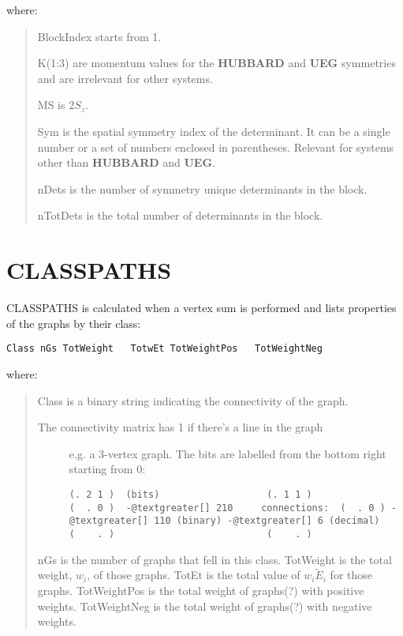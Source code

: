 \documentclass[openany,a4paper,10pt,english]{manual}
\begin{document}
where:
\begin{quote}

BlockIndex starts from 1.

K(1:3) are momentum values for the \textbf{HUBBARD} and \textbf{UEG} symmetries and
are irrelevant for other systems.

MS is $2S_z$.

Sym is the spatial symmetry index of the determinant.  It can be a single
number or a set of numbers enclosed in parentheses.  Relevant for systems
other than \textbf{HUBBARD} and \textbf{UEG}.

nDets is the number of symmetry unique determinants in the block.

nTotDets is the total number of determinants in the block.
\end{quote}

\resetcurrentobjects
\hypertarget{--doc-output/classpaths}{}

\hypertarget{output-classpaths}{}\section{CLASSPATHS}

CLASSPATHS is calculated when a vertex sum is performed and lists properties of the graphs by their class:

\begin{Verbatim}[commandchars=@\[\]]
Class nGs TotWeight   TotwEt TotWeightPos   TotWeightNeg
\end{Verbatim}

where:
\begin{quote}

Class is a binary string indicating the connectivity of the graph.
\begin{description}
\item[The connectivity matrix has 1 if there's a line in the graph] \leavevmode
e.g. a 3-vertex graph.  The bits are labelled from the bottom right starting from 0:

\begin{Verbatim}[commandchars=@\[\]]
(. 2 1 )  (bits)                   (. 1 1 )
(  . 0 )  -@textgreater[] 210     connections:  (  . 0 ) -@textgreater[] 110 (binary) -@textgreater[] 6 (decimal)
(    . )                           (    . )
\end{Verbatim}

\end{description}

nGs is the number of graphs that fell in this class.
TotWeight is the total weight, $w_i$, of those graphs.
TotEt is the total value of $w_i \tilde{E}_i$ for those graphs.
TotWeightPos is the total weight of graphs(?) with positive weights.
TotWeightNeg is the total weight of graphs(?) with negative weights.
\end{quote}
\end{document}
